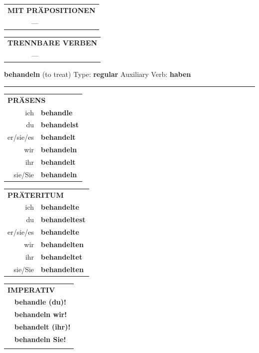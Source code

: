 \documentclass[10pt,a4paper]{revtex4-2}
\begin{document}
\begin{verbbox-acc}
\vspace{10pt}

\begin{tabular}{lll}
\multicolumn{3}{l}{\textbf{MIT PRÄPOSITIONEN}}\\
& ---\\
\end{tabular}
\hfill
\begin{tabular}{lll}
\multicolumn{3}{l}{\textbf{TRENNBARE VERBEN}}\\
& ---\\
\end{tabular}

\vspace{-5pt}
\end{verbbox-acc}

\begin{verbbox}
    {\Large \bf behandeln} (to treat) \hfill Type: \textbf{regular} \hfill Auxiliary Verb: \textbf{haben} 
    
     \vspace{5pt}

    \hrule
    
    \vspace{5pt}

  \begin{tabular}{rl}
     \multicolumn{2}{l}{\textbf{PRÄSENS} }\\
    ich & \textbf{behandle}\\
    du & \textbf{behandelst}\\
    er/sie/es & \textbf{behandelt}\\
    wir & \textbf{behandeln}\\
    ihr & \textbf{behandelt}\\
    sie/Sie & \textbf{behandeln}\\
  \end{tabular}
  \hfill
     \begin{tabular}{rl}
    \multicolumn{2}{l}{\textbf{PRÄTERITUM} }\\
    ich & \textbf{behandelte}\\
    du & \textbf{behandeltest}\\
    er/sie/es & \textbf{behandelte}\\
    wir & \textbf{behandelten}\\
    ihr & \textbf{behandeltet}\\
    sie/Sie & \textbf{behandelten}\\
  \end{tabular}
  \hfill
  \begin{tabular}{rl}
     \multicolumn{2}{l}{\textbf{IMPERATIV} }\\
   & \textbf{behandle (du)!}\\
   & \textbf{behandeln wir!}\\
   & \textbf{behandelt (ihr)!}\\
   & \textbf{behandeln Sie!}\\
   & \vspace{10pt}
  \end{tabular}


\end{verbbox}
\end{document}
